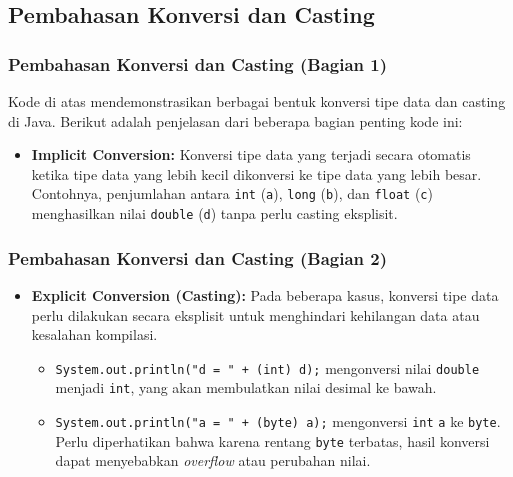 \documentclass[aspectratio=169, table]{beamer}
\begin{document}
\subsection{Pembahasan Konversi dan Casting}
\begin{frame}
	\frametitle{Pembahasan Konversi dan Casting (Bagian 1)}
	Kode di atas mendemonstrasikan berbagai bentuk konversi tipe data dan casting di Java. Berikut adalah penjelasan dari beberapa bagian penting kode ini:
	\begin{itemize}
		\item \textbf{Implicit Conversion:} Konversi tipe data yang terjadi secara otomatis ketika tipe data yang lebih kecil dikonversi ke tipe data yang lebih besar. Contohnya, penjumlahan antara \texttt{int} (\texttt{a}), \texttt{long} (\texttt{b}), dan \texttt{float} (\texttt{c}) menghasilkan nilai \texttt{double} (\texttt{d}) tanpa perlu casting eksplisit.
	\end{itemize}
\end{frame}

\begin{frame}
	\frametitle{Pembahasan Konversi dan Casting (Bagian 2)}
	\begin{itemize}
		\item \textbf{Explicit Conversion (Casting):} Pada beberapa kasus, konversi tipe data perlu dilakukan secara eksplisit untuk menghindari kehilangan data atau kesalahan kompilasi.
		\begin{itemize}
			\item \texttt{System.out.println("d = " + (int) d);} mengonversi nilai \texttt{double} menjadi \texttt{int}, yang akan membulatkan nilai desimal ke bawah.
			\item \texttt{System.out.println("a = " + (byte) a);} mengonversi \texttt{int} \texttt{a} ke \texttt{byte}. Perlu diperhatikan bahwa karena rentang \texttt{byte} terbatas, hasil konversi dapat menyebabkan \textit{overflow} atau perubahan nilai.
		\end{itemize}
	\end{itemize}
\end{frame}
\end{document}
